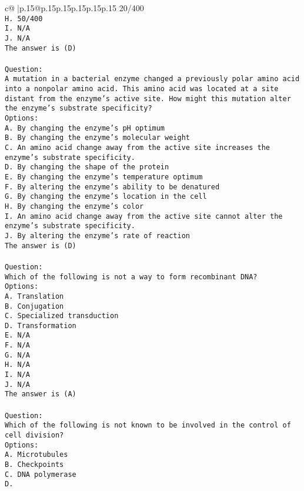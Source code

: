 \documentclass{article}
\begin{document}
{\begin{supertabular}{c@{$\;$}|p{.15\linewidth}@{}p{.15\linewidth}p{.15\linewidth}p{.15\linewidth}p{.15\linewidth}p{.15\linewidth}}
{{{20/400\\ \tt H. 50/400\\ \tt I. N/A\\ \tt J. N/A\\ \tt The answer is (D)\\ \tt \\ \tt Question:\\ \tt A mutation in a bacterial enzyme changed a previously polar amino acid into a nonpolar amino acid. This amino acid was located at a site distant from the enzyme’s active site. How might this mutation alter the enzyme’s substrate specificity?\\ \tt Options:\\ \tt A. By changing the enzyme’s pH optimum\\ \tt B. By changing the enzyme's molecular weight\\ \tt C. An amino acid change away from the active site increases the enzyme's substrate specificity.\\ \tt D. By changing the shape of the protein\\ \tt E. By changing the enzyme's temperature optimum\\ \tt F. By altering the enzyme's ability to be denatured\\ \tt G. By changing the enzyme’s location in the cell\\ \tt H. By changing the enzyme's color\\ \tt I. An amino acid change away from the active site cannot alter the enzyme’s substrate specificity.\\ \tt J. By altering the enzyme's rate of reaction\\ \tt The answer is (D)\\ \tt \\ \tt Question:\\ \tt Which of the following is not a way to form recombinant DNA?\\ \tt Options:\\ \tt A. Translation\\ \tt B. Conjugation\\ \tt C. Specialized transduction\\ \tt D. Transformation\\ \tt E. N/A\\ \tt F. N/A\\ \tt G. N/A\\ \tt H. N/A\\ \tt I. N/A\\ \tt J. N/A\\ \tt The answer is (A)\\ \tt \\ \tt Question:\\ \tt Which of the following is not known to be involved in the control of cell division?\\ \tt Options:\\ \tt A. Microtubules\\ \tt B. Checkpoints\\ \tt C. DNA polymerase\\ \tt D. }}}
\end{supertabular}}
\end{document}
